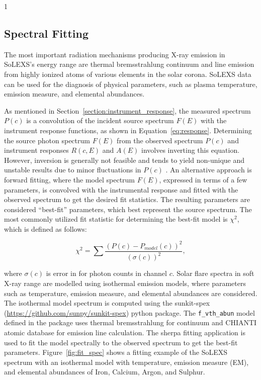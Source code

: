 \documentclass[12pt]{spieman}  %
\begin{document}
\begin{spacing}{1}
\subsection{Spectral Fitting}
The most important radiation mechanisms producing X-ray emission in SoLEXS's energy range are thermal bremsstrahlung continuum and line emission from highly ionized atoms of various elements in the solar corona. SoLEXS data can be used for the diagnosis of physical parameters, such as plasma temperature, emission measure, and elemental abundances.


As mentioned in Section~\ref{section:instrument_response}, the measured spectrum $P(c)$ is a convolution of the incident source spectrum $F(E)$ with the instrument response functions, as shown in Equation~\ref{eq:response}.
Determining the source photon spectrum $F(E)$ from the observed spectrum $P(c)$ and instrument responses $R(c, E)$ and $A(E)$ involves inverting this equation. However, inversion is generally not feasible and tends to yield non-unique and unstable results due to minor fluctuations in $P(c)$ \cite{xspec_guide}. An alternative approach is forward fitting, where the model spectrum $F(E)$, expressed in terms of a few parameters, is convolved with the instrumental response and fitted with the observed spectrum to get the desired fit statistics. The resulting parameters are considered ``best-fit'' parameters, which best represent the source spectrum.
The most commonly utilized fit statistic for determining the best-fit model is $\chi^2$, which is defined as follows:

\begin{equation}
 \chi^2=\sum \frac{\left(P(c)-P_{model}(c)\right)^2}{(\sigma(c))^2},   
\end{equation}
 

where $\sigma(c)$ is error in for photon counts in channel $c$. 
Solar flare spectra in soft X-ray range are modelled using isothermal emission models, where parameters such as temperature, emission measure, and elemental abundances are considered. The isothermal model spectrum is computed using the sunkit-spex (\url{https://github.com/sunpy/sunkit-spex}) python package. The \texttt{f\_vth\_abun} model defined in the package uses thermal bremsstrahlung for continuum and CHIANTI atomic database for emission line calculation. The sherpa fitting application \cite{sherpa_416, sherpa_paper} is used to fit the model spectrally to the observed spectrum to get the best-fit parameters. Figure~\ref{fig:fit_spec} shows a fitting example of the SoLEXS spectrum with an isothermal model with temperature, emission measure (EM), and elemental abundances of Iron, Calcium, Argon, and Sulphur.


\end{spacing}
\end{document}
